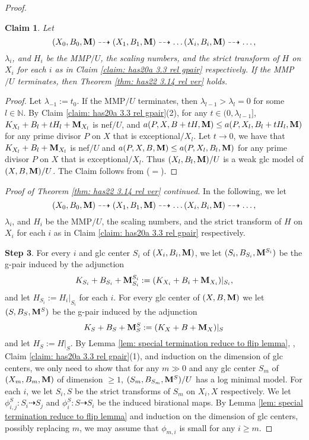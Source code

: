 \documentclass[11pt]{amsart}
\numberwithin{equation}{section}
\newcommand{\Mm}{{\bf{M}}}
\newtheorem{claim}[thm]{Claim}
\theoremstyle{definition}
\theoremstyle{definition}
\theoremstyle{definition}
\begin{document}
\begin{proof}
\begin{claim}\label{claim: has22 3.14 step 2 reduction}
Let
$$(X_0,B_0,\Mm)\dashrightarrow (X_1,B_1,\Mm)\dashrightarrow\dots (X_i,B_i,\Mm)\dashrightarrow\dots,$$
$\lambda_i$, and $H_i$ be the MMP$/U$, the scaling numbers, and the strict transform of $H$ on $X_i$ for each $i$ as in Claim \ref{claim: has20a 3.3 rel gpair} respectively. If the MMP$/U$ terminates, then Theorem \ref{thm: has22 3.14 rel ver} holds.
\end{claim}
\begin{proof}
Let $\lambda_{-1}:=t_0$. If the MMP$/U$ terminates, then $\lambda_{l-1}>\lambda_l=0$ for some $l\in\mathbb N$. By Claim \ref{claim: has20a 3.3 rel gpair}(2), for any $t\in (0,\lambda_{l-1}]$, $K_{X_l}+B_l+tH_l+\Mm_{X_l}$ is nef$/U$, and $a(P,X,B+tH,\Mm)\leq a(P,X_l,B_l+tH_l,\Mm)$ for any prime divisor $P$ on $X$ that is exceptional$/X_l$. Let $t\rightarrow 0$, we have that  $K_{X_l}+B_l+\Mm_{X_l}$ is nef$/U$ and $a(P,X,B,\Mm)\leq a(P,X_l,B_l,\Mm)$ for any prime divisor $P$ on $X$ that is exceptional$/X_l$. Thus $(X_l,B_l,\Mm)/U$ is a weak glc model of $(X,B,\Mm)/U$. The Claim follows from \cite[Lemma 3.8]{HL21} ($=$\cite[Version 3, Lemma 3.15]{HL21}).
\end{proof}

\noindent\textit{Proof of Theorem \ref{thm: has22 3.14 rel ver} continued}. In the following, we let
$$(X_0,B_0,\Mm)\dashrightarrow (X_1,B_1,\Mm)\dashrightarrow\dots (X_i,B_i,\Mm)\dashrightarrow\dots,$$
$\lambda_i$, and $H_i$ be the MMP$/U$, the scaling numbers, and the strict transform of $H$ on $X_i$ for each $i$ as in Claim \ref{claim: has20a 3.3 rel gpair} respectively.

\medskip

\noindent\textbf{Step 3}. For every $i$ and glc center $S_{i}$ of $(X_{i},B_{i},\Mm)$, we let $(S_i,B_{S_i},\Mm^{S_i})$ be the g-pair induced by the adjunction
$$K_{S_i}+B_{S_i}+\Mm^{S_i}_{S_i}:=(K_{X_i}+B_i+\Mm_{X_i})|_{S_i},$$
and let $H_{S_i}:=H_i|_{S_i}$ for each $i$. For every glc center of $(X,B,\Mm)$ we let $(S,B_S,\Mm^S)$ be the g-pair induced by the adjunction
$$K_S+B_S+\Mm^S_S:=(K_X+B+\Mm_X)|_S$$
and let $H_S:=H|_S$. By Lemma \ref{lem: special termination reduce to flip lemma}, \cite[Remark 3.21, Theorem 4.1]{HL18}, Claim \ref{claim: has20a 3.3 rel gpair}(1), and induction on the dimension of glc centers, we only need to show that for any $m\gg 0$ and any glc center $S_m$ of $(X_m,B_m,\Mm)$ of dimension $\geq 1$, $(S_m,B_{S_m},\Mm^S)/U$ has a log minimal model. For each $i$, we let $S_i,S$ be the strict transforms of $S_m$ on $X_i,X$ respectively. We let $\phi^S_{i,j}: S_i\dashrightarrow S_j$  and $\phi^S_i: S\dashrightarrow S_i$ be the induced birational maps. By Lemma \ref{lem: special termination reduce to flip lemma} and induction on the dimension of glc centers, possibly replacing $m$, we may assume that $\phi_{m,i}$ is small for any $i\geq m$.


\end{proof}
\end{document}
